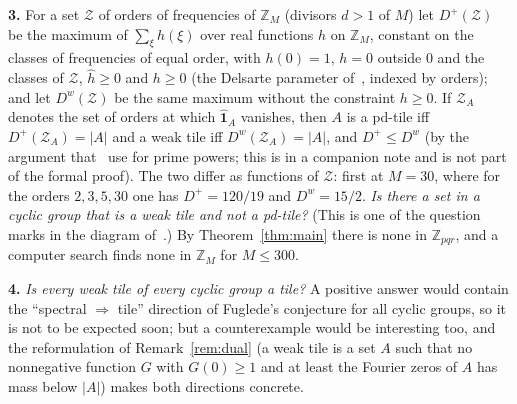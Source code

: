 \documentclass[11pt,a4paper]{amsart}
\theoremstyle{definition}
\theoremstyle{remark}
\newcommand{\Z}{\mathbb{Z}}
\newcommand{\one}{\mathbf{1}}
\begin{document}
\textbf{3.} For a set $\mathcal Z$ of orders of frequencies of $\Z_M$ (divisors $d>1$ of $M$) let $D^+(\mathcal Z)$ be the
maximum of $\sum_\xi h(\xi)$ over real functions $h$ on $\Z_M$, constant on the classes of frequencies of equal
order, with $h(0)=1$, $h=0$ outside $0$ and the classes of $\mathcal Z$, $\hat h\ge 0$ and $h\ge 0$ (the Delsarte
parameter of~\cite{KLMS}, indexed by orders); and let $D^w(\mathcal Z)$ be the same maximum without the constraint
$h\ge 0$. If $\mathcal Z_A$ denotes the set of orders at which $\hat{\one}_A$ vanishes, then $A$ is a pd-tile iff
$D^+(\mathcal Z_A)=|A|$ and a weak tile iff $D^w(\mathcal Z_A)=|A|$, and $D^+\le D^w$ (by the argument that~\cite{KLMS} use for
prime powers; this is in a companion note and is not part of the formal proof). The two differ as functions of
$\mathcal Z$: first at $M=30$, where for the orders $2,3,5,30$ one has $D^+=120/19$ and $D^w=15/2$. \emph{Is there a
set in a cyclic group that is a weak tile and not a pd-tile?} (This is one of the question marks in the diagram
of~\cite{KF}.) By Theorem~\ref{thm:main} there is none in $\Z_{pqr}$, and a computer search finds none in $\Z_M$
for $M\le 300$.

\textbf{4.} \emph{Is every weak tile of every cyclic group a tile?} A positive answer would contain the
``spectral $\Rightarrow$ tile'' direction of Fuglede's conjecture for all cyclic groups, so it is not to be
expected soon; but a counterexample would be interesting too, and the reformulation of Remark~\ref{rem:dual}
(a weak tile is a set $A$ such that no nonnegative function $G$ with $G(0)\ge 1$ and at least the Fourier zeros
of $A$ has mass below $|A|$) makes both directions concrete.
\end{document}
